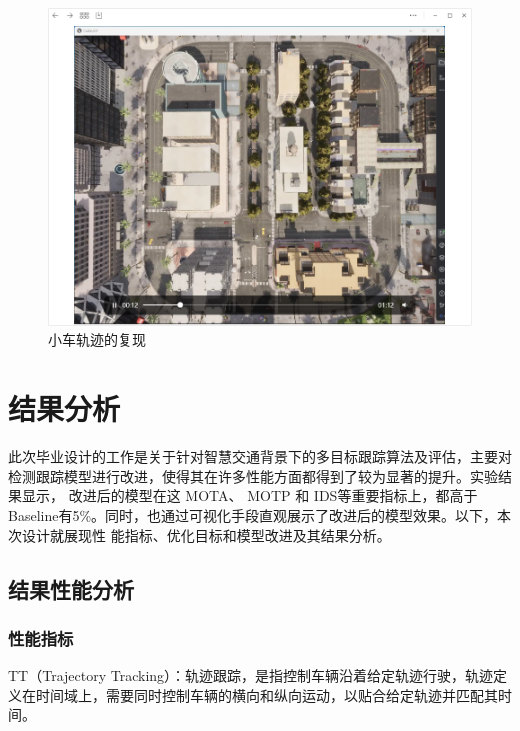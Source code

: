 \begin{figure}[htbp] %
	\centering
	\includegraphics[width=1\textwidth]{p21} %
	\caption{小车轨迹的复现} %
	\label{fig:p21} %
\end{figure}






\section{结果分析}

此次毕业设计的工作是关于针对智慧交通背景下的多目标跟踪算法及评估，主要对检测跟踪模型进行改进，使得其在许多性能方面都得到了较为显著的提升。实验结果显示， 改进后的模型在这 MOTA、 MOTP 和 IDS等重要指标上，都高于Baseline有5\%。同时，也通过可视化手段直观展示了改进后的模型效果。以下，本次设计就展现性 能指标、优化目标和模型改进及其结果分析。








\subsection{结果性能分析}
\subsubsection{性能指标}
TT（Trajectory Tracking）：轨迹跟踪，是指控制车辆沿着给定轨迹行驶，轨迹定义在时间域上，需要同时控制车辆的横向和纵向运动，以贴合给定轨迹并匹配其时间。

